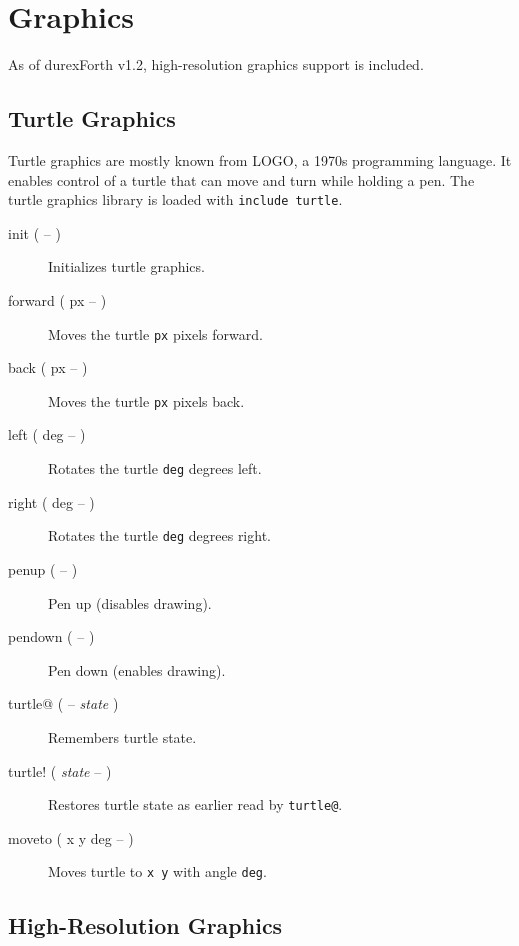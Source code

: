 \chapter{Graphics}

As of durexForth v1.2, high-resolution graphics support is included.

\section{Turtle Graphics}

Turtle graphics are mostly known from LOGO, a 1970s programming language.
It enables control of a turtle that can move and turn while holding a pen.
The turtle graphics library is loaded with \texttt{include turtle}.

\begin{description}
\item[init ( -- )] Initializes turtle graphics.
\item[forward ( px -- )] Moves the turtle \texttt{px} pixels forward.
\item[back ( px -- )] Moves the turtle \texttt{px} pixels back.
\item[left ( deg -- )] Rotates the turtle \texttt{deg} degrees left.
\item[right ( deg -- )] Rotates the turtle \texttt{deg} degrees right.
\item[penup ( -- )] Pen up (disables drawing).
\item[pendown ( -- )] Pen down (enables drawing).
\item[turtle@ ( -- \textit{state} )] Remembers turtle state.
\item[turtle! ( \textit{state} -- )] Restores turtle state as earlier read by \texttt{turtle@}.
\item[moveto ( x y deg -- )] Moves turtle to \texttt{x y} with angle \texttt{deg}.
\end{description}

\section{High-Resolution Graphics}

